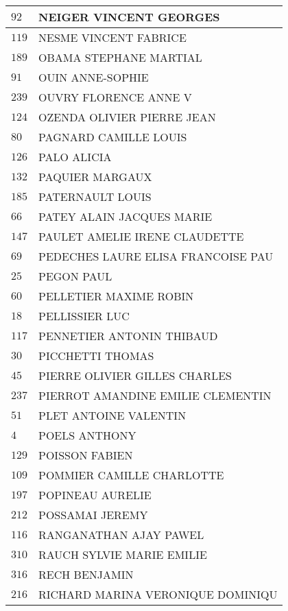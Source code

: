 \begin{xltabular}{\linewidth}{|l|X|}
    \hline
    $92$ & NEIGER VINCENT GEORGES \\
    \hline
    $119$ & NESME VINCENT FABRICE \\
    \hline
    $189$ & OBAMA STEPHANE MARTIAL \\
    \hline
    $91$ & OUIN ANNE-SOPHIE \\
    \hline
    $239$ & OUVRY FLORENCE ANNE V \\
    \hline
    $124$ & OZENDA OLIVIER PIERRE JEAN \\
    \hline
    $80$ & PAGNARD CAMILLE LOUIS \\
    \hline
    $126$ & PALO ALICIA \\
    \hline
    $132$ & PAQUIER MARGAUX \\
    \hline
    $185$ & PATERNAULT LOUIS \\
    \hline
    $66$ & PATEY ALAIN JACQUES MARIE \\
    \hline
    $147$ & PAULET AMELIE IRENE CLAUDETTE \\
    \hline
    $69$ & PEDECHES LAURE ELISA FRANCOISE PAU \\
    \hline
    $25$ & PEGON PAUL \\
    \hline
    $60$ & PELLETIER MAXIME ROBIN \\
    \hline
    $18$ & PELLISSIER LUC \\
    \hline
    $117$ & PENNETIER ANTONIN THIBAUD \\
    \hline
    $30$ & PICCHETTI THOMAS \\
    \hline
    $45$ & PIERRE OLIVIER GILLES CHARLES \\
    \hline
    $237$ & PIERROT AMANDINE EMILIE CLEMENTIN \\
    \hline
    $51$ & PLET ANTOINE VALENTIN \\
    \hline
    $4$ & POELS ANTHONY \\
    \hline
    $129$ & POISSON FABIEN \\
    \hline
    $109$ & POMMIER CAMILLE CHARLOTTE \\
    \hline
    $197$ & POPINEAU AURELIE \\
    \hline
    $212$ & POSSAMAI JEREMY \\
    \hline
    $116$ & RANGANATHAN AJAY PAWEL \\
    \hline
    $310$ & RAUCH SYLVIE MARIE EMILIE \\
    \hline
    $316$ & RECH BENJAMIN \\
    \hline
    $216$ & RICHARD MARINA VERONIQUE DOMINIQU \\

\end{xltabular}
